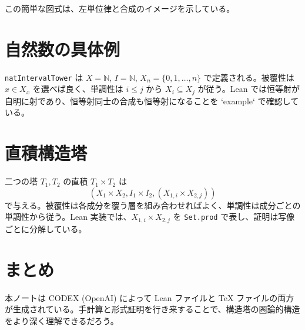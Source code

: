 \documentclass[lualatex]{ltjsarticle}
\begin{document}

この簡単な図式は、左単位律と合成のイメージを示している。

\section{自然数の具体例}
\texttt{natIntervalTower} は $X=\mathbb{N}$, $I=\mathbb{N}$, $X_n=\{0,1,\dots,n\}$ で定義される。被覆性は $x\in X_x$ を選べば良く、単調性は $i\leq j$ から $X_i\subseteq X_j$ が従う。Lean では恒等射が自明に射であり、恒等射同士の合成も恒等射になることを `example` で確認している。

\section{直積構造塔}
二つの塔 $T_1,T_2$ の直積 $T_1\times T_2$ は
\[
(X_1\times X_2, I_1\times I_2, (X_{1,i}\times X_{2,j}))
\]
で与える。被覆性は各成分を覆う層を組み合わせればよく、単調性は成分ごとの単調性から従う。Lean 実装では、$X_{1,i}\times X_{2,j}$ を \texttt{Set.prod} で表し、証明は写像ごとに分解している。

\section*{まとめ}
本ノートは CODEX (OpenAI) によって Lean ファイルと TeX ファイルの両方が生成されている。手計算と形式証明を行き来することで、構造塔の圏論的構造をより深く理解できるだろう。
\end{document}
